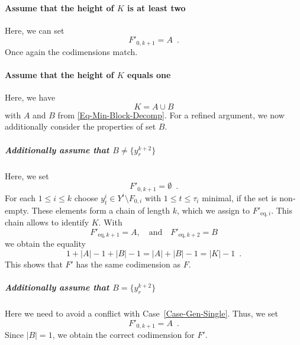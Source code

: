 \documentclass[12pt,a4paper]{amsart}
\theoremstyle{definition}
\begin{document}
\paragraph{Assume that the height of $K$ is at least two}\label{Case-Deg-Height-2}
Here, we can set 
\begin{equation*}
    F'_{0,k+1}=A \enspace .
\end{equation*}
Once again the codimensions match.
\paragraph{Assume that the height of $K$ equals one}\label{Case-Deg-Height-1}
Here, we have
\begin{equation*}
    K=A\cup B
\end{equation*}
with $A$ and $B$ from \eqref{Eq-Min-Block-Decomp}.
For a refined argument, we now additionally consider the properties of set $B$.
\subparagraph{Additionally assume that $B\neq\{y_{r}^{k+2}\}$}\label{Case-Deg-Height-1-Max-Diff}{%
  Here, we set
  \begin{equation*}
    F'_{0,k+1}=\emptyset \enspace . 
  \end{equation*}
  For each $1\leq i\leq k$ choose $y^{i}_{t}\in Y^{{i}}\setminus F_{0,i}$ with $1\leq t\leq\tau_i$ minimal, if the set is non-empty.
  These elements form a chain of length $k$, which we assign to $F'_{\mathrm{eq},i}$.
  This chain allows to identify $K$.
  With
  \begin{equation*}
    F'_{\mathrm{eq},k+1}=A, \quad \text{and} \quad F'_{\mathrm{eq},k+2}=B
  \end{equation*}
  we obtain the equality
  \begin{equation*}
    1+|A|-1+|B|-1=|A|+|B|-1=|K|-1 \enspace.
  \end{equation*}
  This shows that $F'$ has the same codimension as $F$.%
}
\subparagraph{Additionally assume that $B=\{y_{r}^{{k+2}}\}$}\label{Case-Deg-Height-1-Max-Standard}{%
  Here we need to avoid a conflict with Case~\ref{Case-Gen-Single}.
  Thus, we set
  \begin{equation*}
    F'_{0,k+1}=A \enspace .
  \end{equation*}
  Since $|B|=1$, we obtain the correct codimension for $F'$.
}
\end{document}
